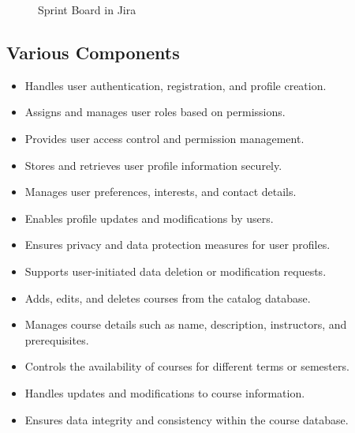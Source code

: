 \begin{figure}[H]
    \centering
    \caption{Sprint Board in Jira}
    \label{fig:sprint_board}
\end{figure}

\subsection{Various Components}
    \begin{itemize}[label=]
        \tightlist
        \item Handles user authentication, registration, and profile creation.
        \item Assigns and manages user roles based on permissions.
        \item Provides user access control and permission management.
    \end{itemize}

    \begin{itemize}[label=]
        \tightlist
        \item Stores and retrieves user profile information securely.
        \item Manages user preferences, interests, and contact details.
        \item Enables profile updates and modifications by users.
        \item Ensures privacy and data protection measures for user profiles.
        \item Supports user-initiated data deletion or modification requests.
    \end{itemize}

    \begin{itemize}[label=]
        \tightlist
        \item Adds, edits, and deletes courses from the catalog database.
        \item Manages course details such as name, description, instructors, and prerequisites.
        \item Controls the availability of courses for different terms or semesters.
        \item Handles updates and modifications to course information.
        \item Ensures data integrity and consistency within the course database.
    \end{itemize}
    
